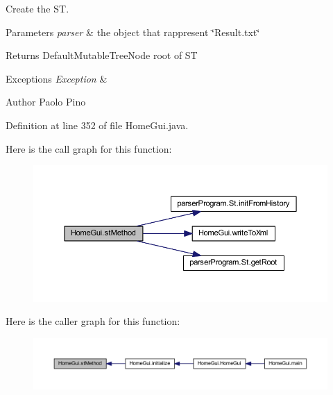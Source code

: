 Create the S\-T. 


\begin{DoxyParams}{Parameters}
{\em parser} & the object that rappresent \char`\"{}\-Result.\-txt\char`\"{} \\
\hline
\end{DoxyParams}
\begin{DoxyReturn}{Returns}
Default\-Mutable\-Tree\-Node root of S\-T 
\end{DoxyReturn}

\begin{DoxyExceptions}{Exceptions}
{\em Exception} & \\
\hline
\end{DoxyExceptions}
\begin{DoxyAuthor}{Author}
Paolo Pino 
\end{DoxyAuthor}


Definition at line 352 of file Home\-Gui.\-java.



Here is the call graph for this function\-:\nopagebreak
\begin{figure}[H]
\begin{center}
\leavevmode
\includegraphics[width=350pt]{class_home_gui_a2903109ca5fa51fc78f8487c79dafc43_cgraph}
\end{center}
\end{figure}




Here is the caller graph for this function\-:\nopagebreak
\begin{figure}[H]
\begin{center}
\leavevmode
\includegraphics[width=350pt]{class_home_gui_a2903109ca5fa51fc78f8487c79dafc43_icgraph}
\end{center}
\end{figure}


